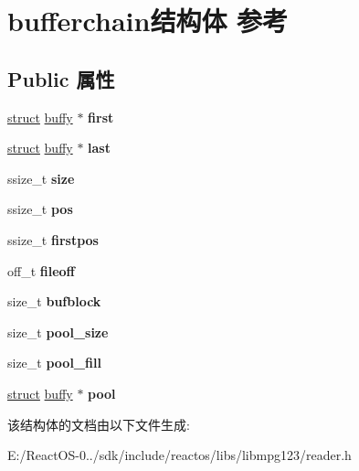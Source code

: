 \hypertarget{structbufferchain}{}\section{bufferchain结构体 参考}
\label{structbufferchain}
\subsection*{Public 属性}
\begin{DoxyCompactItemize}
\item 
\mbox{\label{structbufferchain_ac03a278efbcc6986b2faf3517886e635}} 
\hyperlink{interfacestruct}{struct} \hyperlink{structbuffy}{buffy} $\ast$ {\bfseries first}
\item 
\mbox{\label{structbufferchain_a05e3441dc06b8f0c59ebc3571ee4479e}} 
\hyperlink{interfacestruct}{struct} \hyperlink{structbuffy}{buffy} $\ast$ {\bfseries last}
\item 
\mbox{\label{structbufferchain_a0bdd2dc380d6684287cc32773e3bc933}} 
ssize\+\_\+t {\bfseries size}
\item 
\mbox{\label{structbufferchain_a2c40cd8cc8caf4f9320bbc4bde71ffb8}} 
ssize\+\_\+t {\bfseries pos}
\item 
\mbox{\label{structbufferchain_a670fbe5cb8d5d744344fbfea1a9d9abf}} 
ssize\+\_\+t {\bfseries firstpos}
\item 
\mbox{\label{structbufferchain_a992ae9f9da501674e3c2ade953e341e1}} 
off\+\_\+t {\bfseries fileoff}
\item 
\mbox{\label{structbufferchain_af5fc04c03f97811ffcfee1c461894439}} 
size\+\_\+t {\bfseries bufblock}
\item 
\mbox{\label{structbufferchain_aa7dfe64fa36529f77fe20c8812ef1c75}} 
size\+\_\+t {\bfseries pool\+\_\+size}
\item 
\mbox{\label{structbufferchain_ac479b0562f1885426fc387f82e316077}} 
size\+\_\+t {\bfseries pool\+\_\+fill}
\item 
\mbox{\label{structbufferchain_ae76550a05a7417d196d1088a208045d1}} 
\hyperlink{interfacestruct}{struct} \hyperlink{structbuffy}{buffy} $\ast$ {\bfseries pool}
\end{DoxyCompactItemize}


该结构体的文档由以下文件生成\+:\begin{DoxyCompactItemize}
\item 
E\+:/\+React\+O\+S-\/0../sdk/include/reactos/libs/libmpg123/reader.\+h\end{DoxyCompactItemize}
